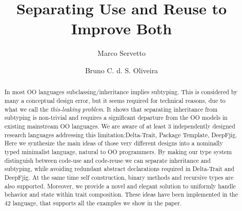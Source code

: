 \documentclass{llncs}
\newcommand\saveSpace{\vspace{-3pt}}
\begin{document}
%
\frontmatter          %
%
\pagestyle{headings}  %
%

\title{Separating Use and Reuse to Improve Both}
%

\author{Marco Servetto \and Bruno C. d. S. Oliveira}
%
%
%

\maketitle              %

\begin{abstract}
\saveSpace\saveSpace\saveSpace
In most OO languages subclassing/inheritance implies
subtyping. This is considered by many a conceptual design error, but it
seems required for technical reasons, due to what we call the
\emph{this-leaking problem}. It shows that separating
inheritance from subtyping is non-trivial and requires a significant
departure from the OO models in existing mainstream OO languages.
We are aware of at least 3 independently designed research languages 
addressing this limitation:Delta-Trait, Package Template, DeepFjig.
Here we synthesize
the main ideas of those very different designs into a nominally typed minimalist language,
natural to OO programmers.
By making our type system distinguish between code-use and code-reuse
we can separate inheritance and subtyping, while avoiding 
redundant abstract declarations required in Delta-Trait and
DeepFjig. At the same time self construction,
binary methods and recursive types are also supported.
Moreover, we provide a novel and elegant solution to uniformly
handle behavior and state within trait composition.
These ideas have been implemented in the 42 language, 
that supports all the examples we show in the paper.
\saveSpace\saveSpace\saveSpace

\saveSpace\saveSpace\saveSpace
\end{abstract}






%






\end{document}
